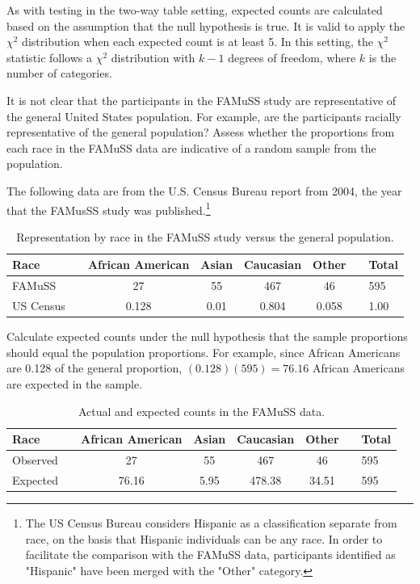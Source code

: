 As with testing in the two-way table setting, expected counts are calculated based on the assumption that the null hypothesis is true. It is valid to apply the $\chi^2$ distribution when each expected count is at least 5. In this setting, the $\chi^2$ statistic follows a $\chi^2$ distribution with $k-1$ degrees of freedom, where $k$ is the number of categories. 

\begin{example} {It is not clear that the participants in the FAMuSS study are representative of the general United States population. For example, are the participants racially representative of the general population? Assess whether the proportions from each race in the FAMuSS data are indicative of a random sample from the population.
		
The following data are from the U.S. Census Bureau report from 2004, the year that the FAMusSS study was published.\footnote{The US Census Bureau considers Hispanic as a classification separate from race, on the basis that Hispanic individuals can be any race. In order to facilitate the comparison with the FAMuSS data, participants identified as "Hispanic" have been merged with the "Other" category.}

\begin{table}[h]
	\centering
	\begin{tabular}{ll ccc c ll}
		\hline
		Race	 & \hspace{2mm} & African American & Asian & Caucasian & Other & \hspace{2mm} & Total \\
		\hline
		FAMuSS &	& 27 & 55 & 467 & 46 & & 595 \\
		US Census	 & 		& 0.128 & 0.01 & 0.804 & 0.058 & & 1.00 \\
		\hline
	\end{tabular}
	\caption{Representation by race in the FAMuSS study versus the general population.}
\end{table}
		
}

Calculate expected counts under the null hypothesis that the sample proportions should equal the population proportions. For example, since African Americans are 0.128 of the general proportion, $(0.128)(595) = 76.16$ African Americans are expected in the sample.

\begin{table}[h]
	\centering
	\begin{tabular}{ll ccc c ll}
		\hline
		Race	 & \hspace{2mm} & African American & Asian & Caucasian & Other & \hspace{2mm} & Total \\
		\hline
		Observed &	& 27 & 55 & 467 & 46 & & 595 \\
		Expected & 	& 76.16 & 5.95 & 478.38 & 34.51 & & 595 \\
		\hline
	\end{tabular}
	\caption{Actual and expected counts in the FAMuSS data.}
\end{table}	


\end{example}
